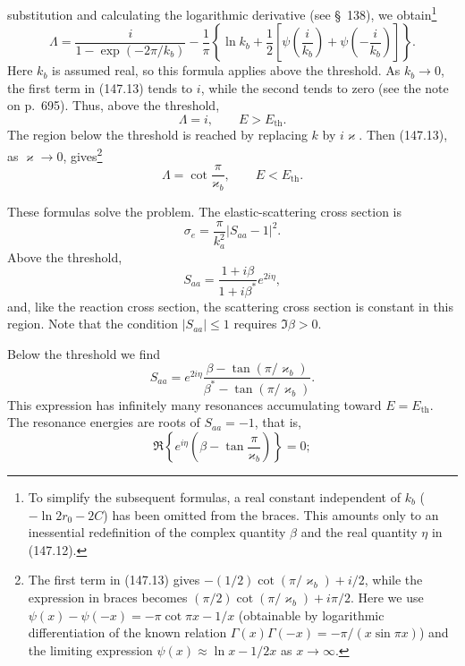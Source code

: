 substitution and calculating the logarithmic derivative (see \S~138), we obtain\footnote{To simplify the subsequent formulas, a real constant independent of $k_b$ ($-\ln2r_0-2C$) has been omitted from the braces. This amounts only to an inessential redefinition of the complex quantity $\beta$ and the real quantity $\eta$ in (147.12).}
\begin{equation}
 \Lambda=\frac{i}{1-\exp(-2\pi/k_b)}-\frac1\pi
 \left\{\ln k_b+\frac12\left[\psi\left(\frac{i}{k_b}\right)+
 \psi\left(-\frac{i}{k_b}\right)\right]\right\}.
 \tag{147.13}
\end{equation}
Here $k_b$ is assumed real, so this formula applies above the threshold. As $k_b\to0$, the first term in (147.13) tends to $i$, while the second tends to zero (see the note on p.~695). Thus, above the threshold,
\begin{equation}
 \Lambda=i,\qquad E>E_{\mathrm{th}}.
 \tag{147.14}
\end{equation}
The region below the threshold is reached by replacing $k$ by $i\varkappa$. Then (147.13), as $\varkappa\to0$, gives\footnote{The first term in (147.13) gives $-(1/2)\cot(\pi/\varkappa_b)+i/2$, while the expression in braces becomes $(\pi/2)\cot(\pi/\varkappa_b)+i\pi/2$. Here we use $\psi(x)-\psi(-x)=-\pi\cot\pi x-1/x$ (obtainable by logarithmic differentiation of the known relation $\Gamma(x)\Gamma(-x)=-\pi/(x\sin\pi x)$) and the limiting expression $\psi(x)\approx\ln x-1/2x$ as $x\to\infty$.}
\begin{equation}
 \Lambda=\cot\frac\pi{\varkappa_b},\qquad E<E_{\mathrm{th}}.
 \tag{147.15}
\end{equation}

These formulas solve the problem. The elastic-scattering cross section is
\[
 \sigma_e=\frac\pi{k_a^2}|S_{aa}-1|^2.
\]
Above the threshold,
\begin{equation}
 S_{aa}=\frac{1+i\beta}{1+i\beta^*}e^{2i\eta},
 \tag{147.16}
\end{equation}
and, like the reaction cross section, the scattering cross section is constant in this region. Note that the condition $|S_{aa}|\leq1$ requires $\Im\beta>0$.

Below the threshold we find
\begin{equation}
 S_{aa}=e^{2i\eta}\frac{\beta-\tan(\pi/\varkappa_b)}
 {\beta^*-\tan(\pi/\varkappa_b)}.
 \tag{147.17}
\end{equation}
This expression has infinitely many resonances accumulating toward $E=E_{\mathrm{th}}$. The resonance energies are roots of $S_{aa}=-1$, that is,
\[
 \Re\left\{e^{i\eta}\left(\beta-\tan\frac\pi{\varkappa_b}\right)\right\}=0;
\]

